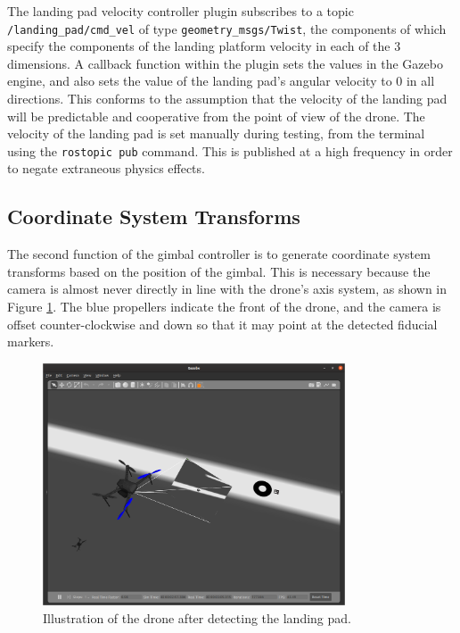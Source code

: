 The landing pad velocity controller plugin subscribes to a topic \texttt{/landing\_pad/cmd\_vel} of type \texttt{geometry\_msgs/Twist}, the components of which specify the components of the landing platform velocity in each of the 3 dimensions. A callback function within the plugin sets the values in the Gazebo engine, and also sets the value of the landing pad's angular velocity to 0 in all directions. This conforms to the assumption that the velocity of the landing pad will be predictable and cooperative from the point of view of the drone. The velocity of the landing pad is set manually during testing, from the terminal using the \texttt{rostopic pub} command. This is published at a high frequency in order to negate extraneous physics effects.

\subsection{Coordinate System Transforms}
\label{subsection:coordinate_system_transforms}

The second function of the gimbal controller is to generate coordinate system transforms based on the position of the gimbal. This is necessary because the camera is almost never directly in line with the drone's axis system, as shown in Figure \ref{fig:camera_offset}. The blue propellers indicate the front of the drone, and the camera is offset counter-clockwise and down so that it may point at the detected fiducial markers.

\begin{figure}
    \centering
    \includegraphics[width=0.8\textwidth]{images/gimbal_controller.png}
    \caption{Illustration of the drone after detecting the landing pad.}
    \label{fig:camera_offset}
\end{figure}

